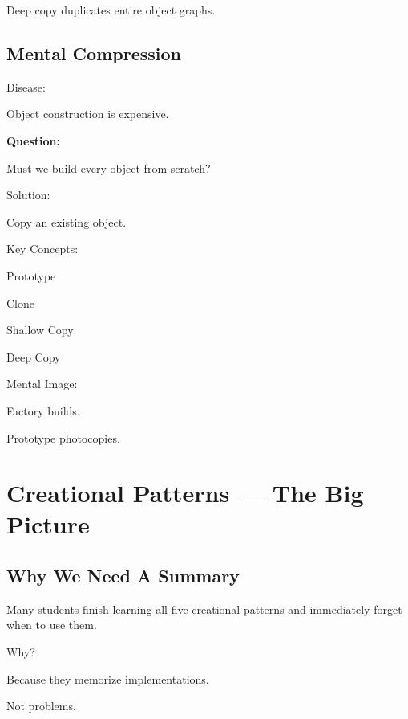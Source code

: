 \documentclass[11pt,a4paper]{book}
\begin{document}
\begin{rosettarule}

Deep copy duplicates entire object graphs.

\end{rosettarule}


\section{Mental Compression}

\begin{compressionbox}

Disease:

Object construction is expensive.

\textbf{Question:}

Must we build every object from scratch?

Solution:

Copy an existing object.

Key Concepts:

Prototype

Clone

Shallow Copy

Deep Copy

Mental Image:

Factory builds.

Prototype photocopies.

\end{compressionbox}
\chapter{Creational Patterns --- The Big Picture}

\section{Why We Need A Summary}

\begin{idea}

Many students finish learning all five creational
patterns and immediately forget when to use them.

Why?

Because they memorize implementations.

Not problems.

\end{idea}
\end{document}
